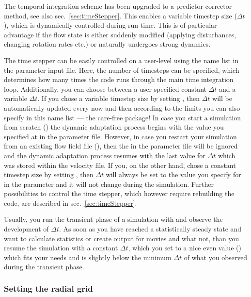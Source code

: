 \documentclass[a4paper, 11pt, DIV=11]{scrartcl}
\begin{document}
The temporal integration scheme has been upgraded to a predictor-corrector
method, see also sec.~\ref{sec:timeStepper}. This enables a variable timestep
size ($\Delta t$), which is dynamically controlled during run time. This is
of particular advantage if the flow state is either suddenly modified
(applying disturbances, changing rotation rates etc.) or naturally undergoes
strong dynamics.
\par
The time stepper can be easily controlled on a user-level using the name list
 in the parameter input file. Here, the number of
timesteps can be specified, which determines how many times the code runs
through the main time integration loop. Additionally, you can choose between
a user-specified constant $\Delta t$ and a variable $\Delta t$. If you chose
a variable timestep size by setting , then $\Delta t$ will 
be automatically updated every now and then according to the limits you can 
also specify in this name list --- the care-free package! In case
you start a simulation from scratch () the dynamic adaptation
process begins with the value you specified at  in the parameter
file. However, in case you restart your simulation from an existing flow field
file (), then the  in the parameter file will
be ignored and the dynamic adaptation process resumes with the last value for
$\Delta t$ which was stored within the velocity file. If you, on the other hand,
chose a constant timestep size by setting , then $\Delta t$
will always be set to the value you specify for  in the parameter
and it will not change during the simulation. Further possibilities to control the
time stepper, which however require rebuilding the code, are described in
sec.~\ref{sec:timeStepper}.
\par
Usually, you run the transient phase of a simulation with 
and observe the development of $\Delta t$. As soon as you have reached a statistically
steady state and want to calculate statistics or create output for movies and what not,
than you resume the simulation with a constant $\Delta t$, which you set to a nice even
value () which fits your needs and is slightly below the minimum
$\Delta t$ of what you observed during the transient phase.

\subsubsection{Setting the radial grid}
\label{sec:radial_grid}
\end{document}
